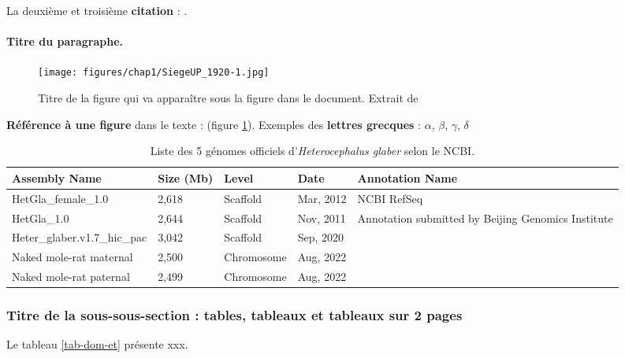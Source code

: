 La deuxième et troisième \textbf{citation} : \cite{Faulkes2013,Faulkes2021}.

\paragraph{Titre du paragraphe.} 

\lipsum[1]

\begin{figure}[h]
\centering
\texttt{[image: figures/chap1/SiegeUP\_1920-1.jpg]} %
\caption[Titre de la figure qui va apparaître dans la table]{Titre de la figure qui va apparaître sous la figure dans le document. Extrait de } %
\label{fig:siegeUP}
\end{figure}

\textbf{Référence à une figure} dans le texte : (figure \ref{fig:siegeUP}). 
Exemples des \textbf{lettres grecques} : $\alpha$, $\beta$, $\gamma$, $\delta$





\begin{table}[tb]%
    \raggedleft
    \caption{Liste des 5 génomes officiels d'\textit{Heterocephalus glaber} selon le NCBI.}
    \begin{tabular}{llllp{4cm}}
    \hline \hline
        \textbf{Assembly Name} & \textbf{Size (Mb)} & \textbf{Level} & \textbf{Date} & \textbf{Annotation Name} \\ \hline
        HetGla\_female\_1.0 & 2,618 & Scaffold & Mar, 2012 & NCBI RefSeq \\ \hline
       HetGla\_1.0 & 2,644 & Scaffold & Nov, 2011 & Annotation submitted by Beijing Genomics Institute \\ \hline
      Heter\_glaber.v1.7\_hic\_pac & 3,042 & Scaffold & Sep, 2020 & ~ \\ \hline
        Naked mole-rat maternal & 2,500 & Chromosome & Aug, 2022 & ~ \\ \hline
       Naked mole-rat paternal & 2,499 & Chromosome & Aug, 2022 & ~ \\ \hline \hline
    \end{tabular}
\end{table}


\subsubsection{Titre de la sous-sous-section : tables, tableaux et tableaux sur 2 pages}
Le tableau \ref{tab-dom-et} présente xxx.

